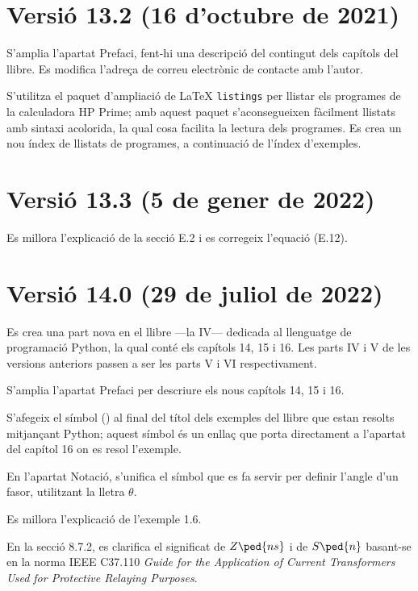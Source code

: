 \section*{Versió 13.2 (16 d'octubre de 2021)}

S'amplia l'apartat Prefaci, fent-hi una descripció del contingut dels capítols del llibre. Es modifica l'adreça de correu electrònic de contacte amb l'autor.

S'utilitza el paquet d'ampliació de \LaTeX{} \texttt{listings} per llistar els programes de la calculadora \textsf{HP Prime}; amb aquest paquet s'aconsegueixen fàcilment  llistats amb sintaxi acolorida, la qual cosa facilita la lectura dels programes. Es crea un nou índex de llistats de programes, a continuació de l'índex d'exemples.


\section*{Versió 13.3 (5 de gener de 2022)}

Es millora l'explicació de la secció E.2 i es corregeix l'equació (E.12).


\section*{Versió 14.0 (29 de juliol de 2022)}

Es crea una part nova en el llibre ---la IV--- dedicada al llenguatge de programació Python, la qual conté els capítols 14, 15 i 16. Les parts IV i V de les versions anteriors passen a ser les parts V  i VI  respectivament. 

S'amplia l'apartat Prefaci per descriure els nous capítols 14, 15 i 16.

S'afegeix el símbol (\faPython) al final del títol dels  exemples del llibre que estan resolts mitjançant Python; aquest símbol és un enllaç que porta directament a l'apartat del capítol 16 on es resol l'exemple.

En l'apartat Notació, s'unifica el símbol que es fa servir per definir l'angle d'un fasor, utilitzant la lletra $\theta$.

Es millora l'explicació de l'exemple 1.6.

En la secció 8.7.2, es clarifica el significat de $Z\ped{ns}$ i de $S\ped{n}$ basant-se en la norma IEEE C37.110 \textit{ Guide for the Application of Current Transformers Used for Protective Relaying Purposes}.

